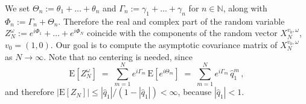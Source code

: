 \documentclass[a4paper,reqno,11pt]{amsart}
\numberwithin{equation}{section}
\newcommand{\go}{\omega}
\newcommand{\N}{\mathbb{N}}
\def\bE{\ensuremath{\bs{\mathrm{E}}}}
\def\bs{\boldsymbol}
\begin{document}
 We set $\Theta_n := \theta_1 + \ldots + \theta_n$ and  $\Gamma_n := \gamma_1 +
\ldots + \gamma_n$ for $n\in\N$, along with $\Phi_n:= \Gamma_n +\Theta_n$.
Therefore the real and complex part of
the random variable $Z_N^\go:= e^{i\Phi_1}+\ldots +
e^{i\Phi_N}$ coincide with the components
of the random vector $X_N^{v_0,\go}$, $v_0=(1,0)$.
Our goal is to compute the asymptotic covariance matrix of $X_N^{v_0,\go}$
as $N \to \infty$. Note that no centering is needed, since
\begin{equation}
    \bE\left[Z_N^\go\right] \;=\; \sum_{m=1}^N e^{i \Gamma_m} \, \bE\left[e^{i \Theta_m}\right]
    \;=\; \sum_{m=1}^N e^{i \Gamma_m} \, \hat{q}_1^m\,,
\end{equation}
and therefore $|\bE[Z_N]| \le |\hat{q}_1|/(1-|\hat{q}_1|) < \infty$,
because $|\hat q_1| < 1$.
\end{document}
